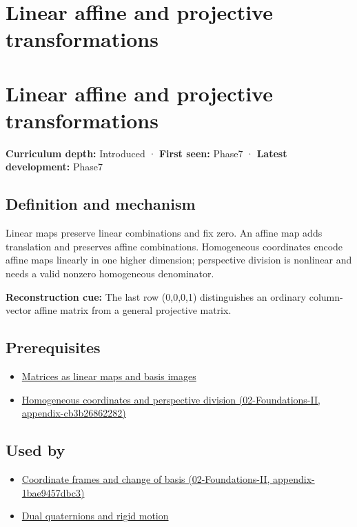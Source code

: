 \hypertarget{appendix-0bf0ca73f735}{}
\section*{Linear affine and projective transformations}
\section{Linear affine and projective transformations}\label{linear-affine-and-projective-transformations}

\textbf{Curriculum depth:} Introduced · \textbf{First seen:} Phase7 · \textbf{Latest development:} Phase7

\subsection{Definition and mechanism}\label{definition-and-mechanism}

Linear maps preserve linear combinations and fix zero. An affine map adds translation and preserves affine combinations. Homogeneous coordinates encode affine maps linearly in one higher dimension; perspective division is nonlinear and needs a valid nonzero homogeneous denominator.

\textbf{Reconstruction cue:} The last row (0,0,0,1) distinguishes an ordinary column-vector affine matrix from a general projective matrix.

\subsection{Prerequisites}\label{prerequisites}

\begin{itemize}
\tightlist
\item
  \hyperref[appendix-bd39c3bf5d64]{Matrices as linear maps and basis images}
\item
  \href{}{Homogeneous coordinates and perspective division (02-Foundations-II, appendix-cb3b26862282)}
\end{itemize}

\subsection{Used by}\label{used-by}

\begin{itemize}
\tightlist
\item
  \href{}{Coordinate frames and change of basis (02-Foundations-II, appendix-1bae9457dbc3)}
\item
  \hyperref[appendix-d1ea57347893]{Dual quaternions and rigid motion}
\end{itemize}

